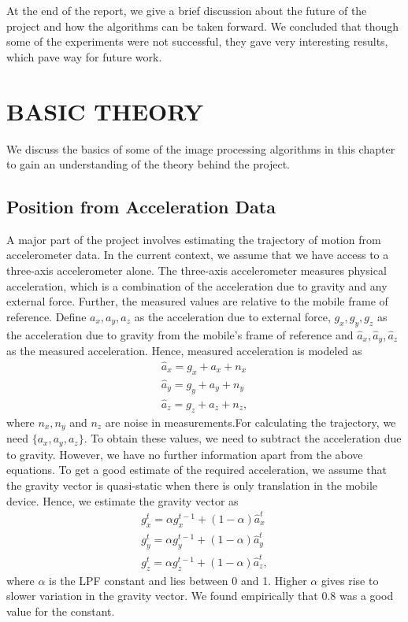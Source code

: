 \documentclass[BTech]{iitmdiss}
\begin{document}
At the end of the report, we give a brief discussion about the future of the 
project and how the algorithms can be taken forward. We concluded that
though some of the experiments were not successful, they gave very
interesting results, which pave way for future work.

\chapter{BASIC THEORY}
\label{chap:basic_theory}
We discuss the basics of some of the image processing algorithms in this
chapter to gain an understanding of the theory behind the project.

\section{Position from Acceleration Data}
\label{basic_theory:accel}
A major part of the project involves estimating the trajectory of motion
from accelerometer data. In the current context, we assume that we have
access to a three-axis accelerometer alone. The three-axis accelerometer 
measures physical acceleration, which is a combination of the 
acceleration due to gravity and any external force. Further, the 
measured values are relative to the mobile frame of reference. Define
${a_x, a_y, a_z}$ as the acceleration due to external force,
${g_x, g_y, g_z}$ as the acceleration due to gravity from the mobile's
frame of reference and ${\hat{a}_x, \hat{a}_y, \hat{a}_z}$ as the measured
acceleration. Hence, measured acceleration is modeled as
\begin{align*}
\hat{a}_x= g_x + a_x + n_x\\
\hat{a}_y= g_y + a_y + n_y\\
\hat{a}_z= g_z + a_z + n_z,
\end{align*}
where $n_x, n_y$ and $n_z$ are noise in measurements.For calculating
the trajectory, we need $\{a_x,a_y,a_z\}$. To obtain 
these values, we need to subtract the acceleration due to gravity. 
However, we have no further information apart from the above equations.
To get a good estimate of the required acceleration, we assume that the
gravity vector is quasi-static when there is only translation in the 
mobile device. Hence, we estimate the gravity vector as
\begin{align*}
g_x^t= \alpha{g_x^{t-1}} + (1-\alpha)\hat{a}_x^t\\
g_y^t= \alpha{g_y^{t-1}} + (1-\alpha)\hat{a}_y^t\\
g_z^t= \alpha{g_z^{t-1}} + (1-\alpha)\hat{a}_z^t,
\end{align*}
where $\alpha$ is the LPF constant and lies between 0 and 1. Higher
$\alpha$ gives rise to slower variation in the gravity vector. We found
empirically that $0.8$ was a good value for the constant.
\end{document}
